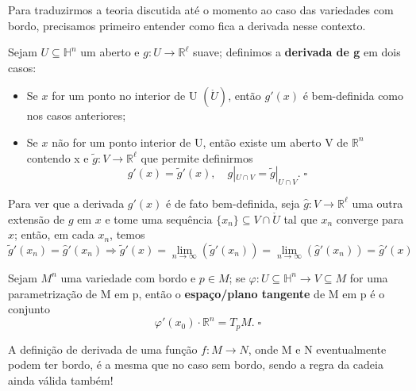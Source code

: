\documentclass[../differential_topology.tex]{subfiles}
\begin{document}
Para traduzirmos a teoria discutida até o momento ao caso das variedades com bordo, precisamos primeiro entender como fica a derivada nesse contexto.
\begin{def*}
	Sejam \(U\subseteq \mathbb{H}^{n}\) um aberto e \(g:U\rightarrow \mathbb{R}^{\ell }\) suave; definimos a \textbf{derivada de g} em dois casos:
	\begin{itemize}
		\item[i)] Se \(x\) for um ponto no interior de U \( (\ring{U})\), então \(g'(x)\) é bem-definida como nos casos anteriores;
		\item[ii)] Se \(x\) não for um ponto interior de U, então existe um aberto V de \(\mathbb{R}^{n}\) contendo x e \(\tilde{g}:V\rightarrow \mathbb{R}^{\ell }\) que permite definirmos
		      \[
			      g'(x) = \tilde{g}'(x), \quad  g|_{U\cap V} = \tilde{g}|_{U\cap V}.\; \square
		      \]
	\end{itemize}
\end{def*}
Para ver que a derivada \(g'(x)\) é de fato bem-definida, seja \(\hat{g}:V\rightarrow \mathbb{R}^{\ell }\) uma outra extensão de \(g\) em \(x\) e tome uma sequência \(\{x_{n}\}\subseteq V\cap \ring{U}\) tal que \(x_{n}\) converge para \(x\); então, em cada \(x_{n}\), temos
\[
	\tilde{g}'(x_{n}) = \hat{g}'(x_{n}) \Rightarrow \tilde{g}'(x) = \lim_{n\to \infty}(\tilde{g}'(x_{n})) = \lim_{n\to \infty}(\hat{g}'(x_{n})) = \hat{g}'(x)
\]
\begin{def*}
	Sejam \(M^{n}\) uma variedade com bordo e \(p\in M\); se \(\varphi :U\subseteq \mathbb{H}^{n}\rightarrow V \subseteq M\) for uma parametrização de M em p, então o \textbf{espaço/plano tangente} de M em p é o  conjunto
	\[
		\varphi '(x_{0})\cdot \mathbb{R}^{n} = T_{p}M. \; \square
	\]
\end{def*}
A definição de derivada de uma função \(f:M\rightarrow N\), onde M e N eventualmente podem ter bordo, é a mesma que no caso sem bordo, sendo a regra da cadeia ainda válida também!
\end{document}
